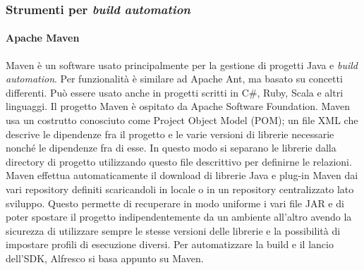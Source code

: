 \subsubsection{Strumenti per \emph{build automation}}
\paragraph{Apache Maven}
 Maven è un software usato principalmente per la gestione di progetti Java e \emph{build automation}. Per funzionalità è similare ad Apache Ant, ma basato su concetti differenti. Può essere usato anche in progetti scritti in C\#, Ruby, Scala e altri linguaggi. Il progetto Maven è ospitato da Apache Software Foundation.
Maven usa un costrutto conosciuto come Project Object Model (POM); un file XML che descrive le dipendenze fra il progetto e le varie versioni di librerie necessarie nonché le dipendenze fra di esse. In questo modo si separano le librerie dalla directory di progetto utilizzando questo file descrittivo per definirne le relazioni.
Maven effettua automaticamente il download di librerie Java e plug-in Maven dai vari repository definiti scaricandoli in locale o in un repository centralizzato lato sviluppo. Questo permette di recuperare in modo uniforme i vari file JAR e di poter spostare il progetto indipendentemente da un ambiente all'altro avendo la sicurezza di utilizzare sempre le stesse versioni delle librerie e la possibilità di impostare profili di esecuzione diversi.
Per automatizzare la build e il lancio dell'SDK, Alfresco si basa appunto su Maven.

